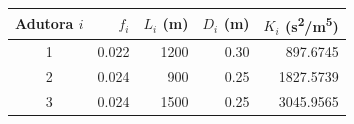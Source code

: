 \begin{tabular}{crrrr}
\toprule
Adutora $i$ & $f_i$ & $L_i$ (\si{m}) & $D_i$ (\si{m}) & $K_i$ (\si{s^2/m^5}) \\
\midrule
1 & \num{0.022} & \num{1200} & \num{0.30} & \num{897.6745} \\
2 & \num{0.024} & \num{900} & \num{0.25} & \num{1827.5739} \\
3 & \num{0.024} & \num{1500} & \num{0.25} & \num{3045.9565} \\
\bottomrule
\end{tabular}
